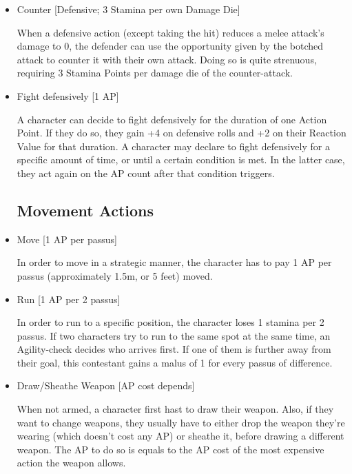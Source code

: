 \begin{itemize}
\item Counter [Defensive; 3 Stamina per own Damage Die]

When a defensive action (except taking the hit) reduces a melee attack's damage to 0, the defender can use the opportunity given by the botched attack to counter it with their own attack. Doing so is quite strenuous, requiring 3 Stamina Points per damage die of the counter-attack.



\item Fight defensively [1 AP]

A character can decide to fight defensively for the duration of one Action Point. If they do so, they gain +4 on defensive rolls and +2 on their Reaction Value for that duration. A character may declare to fight defensively for a specific amount of time, or until a certain condition is met. In the latter case, they act again on the AP count after that condition triggers.


\subsection{Movement Actions}

\item Move [1 AP per passus]

In order to move in a strategic manner, the character has to pay 1 AP per passus (approximately 1.5m, or 5 feet) moved. 



\item Run  [1 AP per 2 passus]

In order to run to a specific position, the character loses 1 stamina per 2 passus. If two characters try to run to the same spot at the same time, an Agility-check decides who arrives first. If one of them is further away from their goal, this contestant gains a malus of 1 for every passus of difference.



\item Draw/Sheathe Weapon  [AP cost depends]

When not armed, a character first hast to draw their weapon. Also, if they want to change weapons, they usually have to either drop the weapon they're wearing (which doesn't cost any AP) or sheathe it, before drawing a different weapon. The AP to do so is equals to the AP cost of the most expensive action the weapon allows.


\end{itemize}

